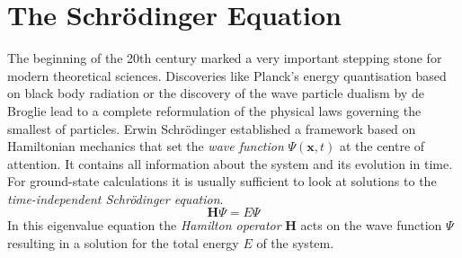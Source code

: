 \section{The Schr\"odinger Equation}
\label{sec:schrodingerequation}

The beginning of the 20th century marked a very important stepping stone for
modern theoretical sciences. Discoveries like Planck's energy quantisation
based on black body
radiation\autocite{Planck_UeberGesetzEnergieverteilung_1901} or the discovery
of the wave particle dualism by de
Broglie\autocite{Broglie_RecherchestheorieQuanta_1925} lead to a complete
reformulation of the physical laws governing the smallest of particles. Erwin
Schr\"odinger established a framework based on Hamiltonian mechanics that set
the \textit{wave function} $\Psi(\mathbf{x},t)$ at the centre of
attention.\autocite{Schrodinger_QuantisierungalsEigenwertproblem_1926} It
contains all information about the system and its evolution in time. For
ground-state calculations it is usually sufficient to look at solutions to the
\textit{time-independent Schr\"odinger equation}.
%
\begin{equation}
	\mathbf{H}\Psi=E\Psi\label{eqn:SchrodingerEquation}
\end{equation}%
%
In this eigenvalue equation the \textit{Hamilton operator} $\mathbf{H}$ acts on
the wave function $\Psi$ resulting in a solution for the total energy $E$ of the
system. 

